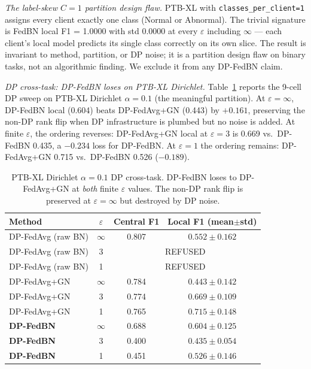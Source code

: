 \documentclass[conference]{IEEEtran}
\newcommand{\code}[1]{\texttt{\small #1}}
\begin{document}
\emph{The label-skew $C{=}1$ partition design flaw.} PTB-XL with \code{classes\_per\_client=1} assigns every client exactly one class (Normal or Abnormal). The trivial signature is FedBN local F1 = 1.0000 with std 0.0000 at every $\varepsilon$ including $\infty$ --- each client's local model predicts its single class correctly on its own slice. The result is invariant to method, partition, or DP noise; it is a partition design flaw on binary tasks, not an algorithmic finding. We exclude it from any DP-FedBN claim.

\emph{DP cross-task: DP-FedBN loses on PTB-XL Dirichlet.} Table~\ref{tab:ptbxldp} reports the 9-cell DP sweep on PTB-XL Dirichlet $\alpha{=}0.1$ (the meaningful partition). At $\varepsilon{=}\infty$, DP-FedBN local (0.604) beats DP-FedAvg+GN (0.443) by $+0.161$, preserving the non-DP rank flip when DP infrastructure is plumbed but no noise is added. At finite $\varepsilon$, the ordering reverses: DP-FedAvg+GN local at $\varepsilon{=}3$ is 0.669 vs.\ DP-FedBN 0.435, a $-0.234$ loss for DP-FedBN. At $\varepsilon{=}1$ the ordering remains: DP-FedAvg+GN 0.715 vs.\ DP-FedBN 0.526 ($-0.189$).

\begin{table}[t]
\centering
\caption{PTB-XL Dirichlet $\alpha{=}0.1$ DP cross-task. DP-FedBN loses to DP-FedAvg+GN at \emph{both} finite $\varepsilon$ values. The non-DP rank flip is preserved at $\varepsilon{=}\infty$ but destroyed by DP noise.}
\label{tab:ptbxldp}
\begin{tabular}{lccc}
\toprule
Method & $\varepsilon$ & Central F1 & Local F1 (mean$\pm$std) \\
\midrule
DP-FedAvg (raw BN) & $\infty$ & 0.807 & $0.552 \pm 0.162$ \\
DP-FedAvg (raw BN) & 3 & \multicolumn{2}{c}{REFUSED} \\
DP-FedAvg (raw BN) & 1 & \multicolumn{2}{c}{REFUSED} \\
DP-FedAvg+GN & $\infty$ & 0.784 & $0.443 \pm 0.142$ \\
DP-FedAvg+GN & 3 & 0.774 & $\mathbf{0.669 \pm 0.109}$ \\
DP-FedAvg+GN & 1 & 0.765 & $\mathbf{0.715 \pm 0.148}$ \\
\textbf{DP-FedBN} & $\infty$ & 0.688 & $0.604 \pm 0.125$ \\
\textbf{DP-FedBN} & 3 & 0.400 & $0.435 \pm 0.054$ \\
\textbf{DP-FedBN} & 1 & 0.451 & $0.526 \pm 0.146$ \\
\bottomrule
\end{tabular}
\end{table}
\end{document}
